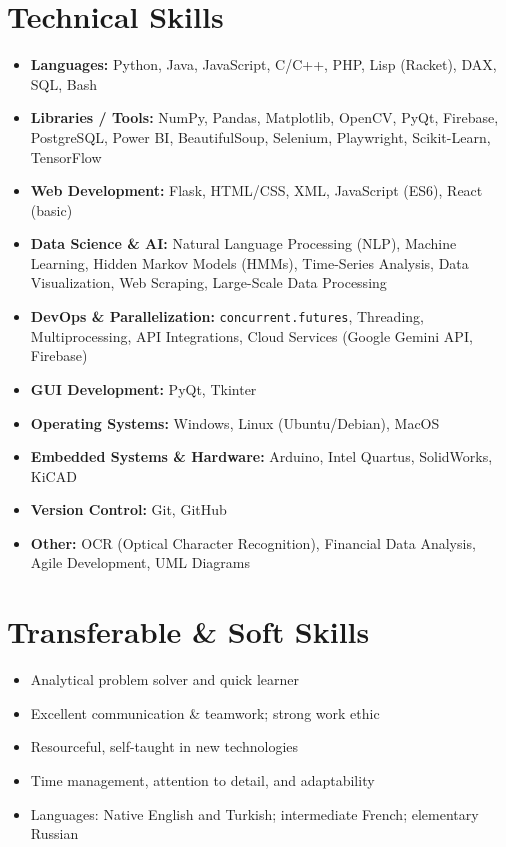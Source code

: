 \documentclass[11pt]{article}
\begin{document}
\section*{Technical Skills}
\begin{itemize}
    \item \textbf{Languages:} Python, Java, JavaScript, C/C++, PHP, Lisp (Racket), DAX, SQL, Bash
    \item \textbf{Libraries / Tools:} NumPy, Pandas, Matplotlib, OpenCV, PyQt, Firebase, PostgreSQL, Power BI, BeautifulSoup, Selenium, Playwright, Scikit-Learn, TensorFlow
    \item \textbf{Web Development:} Flask, HTML/CSS, XML, JavaScript (ES6), React (basic)
    \item \textbf{Data Science \& AI:} Natural Language Processing (NLP), Machine Learning, Hidden Markov Models (HMMs), Time-Series Analysis, Data Visualization, Web Scraping, Large-Scale Data Processing
    \item \textbf{DevOps \& Parallelization:} \texttt{concurrent.futures}, Threading, Multiprocessing, API Integrations, Cloud Services (Google Gemini API, Firebase)
    \item \textbf{GUI Development:} PyQt, Tkinter
    \item \textbf{Operating Systems:} Windows, Linux (Ubuntu/Debian), MacOS
    \item \textbf{Embedded Systems \& Hardware:} Arduino, Intel Quartus, SolidWorks, KiCAD
    \item \textbf{Version Control:} Git, GitHub
    \item \textbf{Other:} OCR (Optical Character Recognition), Financial Data Analysis, Agile Development, UML Diagrams
\end{itemize}

\section*{Transferable \& Soft Skills}
\begin{itemize}
    \item Analytical problem solver and quick learner
    \item Excellent communication \& teamwork; strong work ethic
    \item Resourceful, self-taught in new technologies
    \item Time management, attention to detail, and adaptability
    \item Languages: Native English and Turkish; intermediate French; elementary Russian
\end{itemize}
\end{document}
